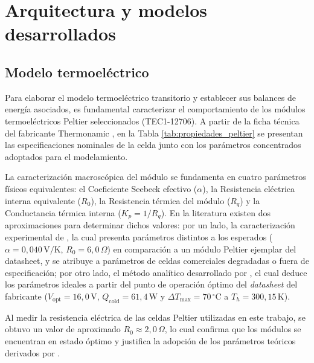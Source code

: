 \documentclass[12pt, a4paper]{article}
\begin{document}
\section{Arquitectura y modelos desarrollados}

\subsection{Modelo termoeléctrico}

Para elaborar el modelo termoeléctrico transitorio y establecer sus balances de energía asociados, es fundamental caracterizar el comportamiento de los módulos termoeléctricos Peltier seleccionados (TEC1-12706). A partir de la ficha técnica del fabricante Thermonamic \parencite{Thermonamic_datasheet}, en la Tabla \ref{tab:propiedades_peltier} se presentan las especificaciones nominales de la celda junto con los parámetros concentrados adoptados para el modelamiento.

La caracterización macroscópica del módulo se fundamenta en cuatro parámetros físicos equivalentes: el Coeficiente Seebeck efectivo ($\alpha$), la Resistencia eléctrica interna equivalente ($R_0$), la Resistencia térmica del módulo ($R_q$) y la Conductancia térmica interna ($K_p = 1/R_q$). En la literatura existen dos aproximaciones para determinar dichos valores: por un lado, la caracterización experimental de \textcite{Kubov_2016}, la cual presenta parámetros distintos a los esperados ($\alpha = 0{,}040\,\text{V/K}$, $R_0 = 6{,}0\,\Omega$) en comparación a un módulo Peltier ejemplar del datasheet, y se atribuye a parámetros de celdas comerciales degradadas o fuera de especificación; por otro lado, el método analítico desarrollado por \textcite{Dymytrov_2017}, el cual deduce los parámetros ideales a partir del punto de operación óptimo del \textit{datasheet} del fabricante ($V_{\text{opt}} = 16{,}0\,\text{V}$, $Q_{\text{cold}} = 61{,}4\,\text{W}$ y $\Delta T_{\max} = 70\,^\circ\text{C}$ a $T_h = 300{,}15\,\text{K}$). 

Al medir la resistencia eléctrica de las celdas Peltier utilizadas en este trabajo, se obtuvo un valor de aproximado $R_0 \approx 2{,}0\,\Omega$, lo cual confirma que los módulos se encuentran en estado óptimo y justifica la adopción de los parámetros teóricos derivados por \textcite{Dymytrov_2017}.
\end{document}
